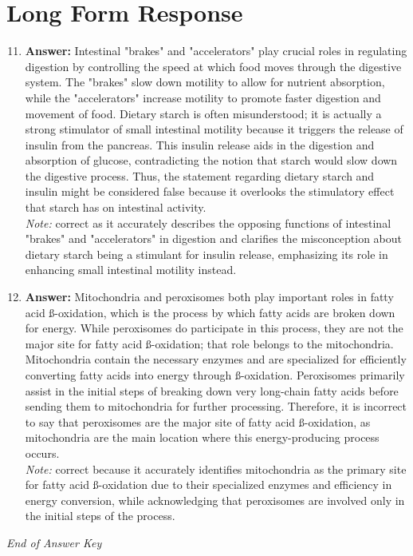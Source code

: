 \documentclass[12pt]{article}
\begin{document}
\section*{Long Form Response}
\begin{enumerate}[label=\arabic*.]
\setcounter{enumi}{10}
\item \textbf{Answer:} Intestinal "brakes" and "accelerators" play crucial roles in regulating digestion by controlling the speed at which food moves through the digestive system. The "brakes" slow down motility to allow for nutrient absorption, while the "accelerators" increase motility to promote faster digestion and movement of food. Dietary starch is often misunderstood; it is actually a strong stimulator of small intestinal motility because it triggers the release of insulin from the pancreas. This insulin release aids in the digestion and absorption of glucose, contradicting the notion that starch would slow down the digestive process. Thus, the statement regarding dietary starch and insulin might be considered false because it overlooks the stimulatory effect that starch has on intestinal activity.
\\ \textit{Note:} correct as it accurately describes the opposing functions of intestinal "brakes" and "accelerators" in digestion and clarifies the misconception about dietary starch being a stimulant for insulin release, emphasizing its role in enhancing small intestinal motility instead.
\item \textbf{Answer:} Mitochondria and peroxisomes both play important roles in fatty acid ß-oxidation, which is the process by which fatty acids are broken down for energy. While peroxisomes do participate in this process, they are not the major site for fatty acid ß-oxidation; that role belongs to the mitochondria. Mitochondria contain the necessary enzymes and are specialized for efficiently converting fatty acids into energy through ß-oxidation. Peroxisomes primarily assist in the initial steps of breaking down very long-chain fatty acids before sending them to mitochondria for further processing. Therefore, it is incorrect to say that peroxisomes are the major site of fatty acid ß-oxidation, as mitochondria are the main location where this energy-producing process occurs.
\\ \textit{Note:} correct because it accurately identifies mitochondria as the primary site for fatty acid ß-oxidation due to their specialized enzymes and efficiency in energy conversion, while acknowledging that peroxisomes are involved only in the initial steps of the process.
\end{enumerate}

\vfill
\noindent\textit{End of Answer Key}
\end{document}
